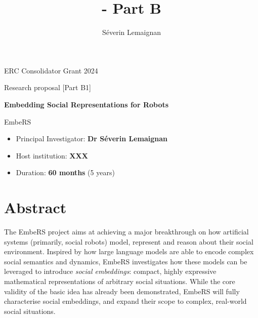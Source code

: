\documentclass[11pt,a4paper]{report}
\title{\project - Part B}
\author{Séverin Lemaignan}
\newcommand{\project}{EmbeRS\xspace}
\newcommand{\eu}[1]{}
\begin{document}
\maketitle

\begin{center}
    ERC Consolidator Grant 2024

    Research proposal [Part B1]

    \vspace{2cm}

    \textbf{\LARGE Embedding Social Representations for Robots}

    \vspace{2cm}
    {\Huge \project}

\end{center}

    \vspace{2cm}

\begin{itemize}
    \item Principal Investigator: \textbf{Dr Séverin Lemaignan}
    \item Host institution: \textbf{XXX}
    \item Duration: \textbf{60 months} (5 years)
\end{itemize}

\section*{Abstract}\label{abstract}

\eu{The abstract (summary) should, at a glance, provide the reader with a clear
understanding of the objectives of the research proposal and how they will be
achieved. The abstract will be used as the short description of your research
proposal in the evaluation process and in communications to contact in
particular the potential remote referees and/or inform the Commission and/or the
programme management committees and/or relevant national funding agencies
(provided you give permission to do so where requested in the online proposal
submission forms, section 1). It must therefore be short and precise and should
not contain confidential information. \\
Please use plain typed text, avoiding formulae and other special characters. The
abstract must be written in English. There is a limit of 2000 characters (spaces
and line breaks included).}


The \project project aims at achieving a major breakthrough on how artificial
systems (primarily, social robots) model, represent and reason about their
social environment. Inspired by how large language models are able to encode
complex social semantics and dynamics, \project investigates how
these models can be leveraged to introduce \emph{social embeddings}: compact,
highly expressive mathematical representations of arbitrary social situations.
While the core validity of the basic idea has already been demonstrated,
\project will fully characterise social embeddings, and expand their scope to
complex, real-world social situations.
\end{document}
